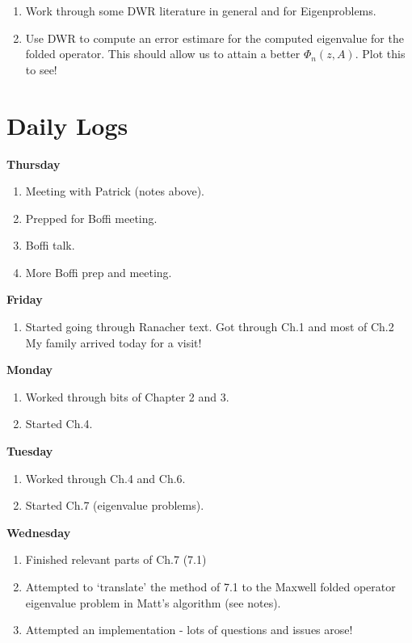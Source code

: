 \documentclass[12pt,a4paper]{article}
\begin{document}
\begin{enumerate}
    \item Work through some DWR literature in general and for Eigenproblems.
    \item Use DWR to compute an error estimare for the computed eigenvalue for the folded operator. This should allow us to attain a better $\Phi_n(z, A).$ Plot this to see!

\end{enumerate}


\section{Daily Logs}

\textbf{Thursday}

\begin{enumerate}
    \item Meeting with Patrick (notes above).
    \item Prepped for Boffi meeting.
    \item Boffi talk.
    \item More Boffi prep and meeting.
\end{enumerate}

\textbf{Friday}

\begin{enumerate}
    \item Started going through Ranacher text. Got through Ch.1 and most of Ch.2 My family arrived today for a visit!
\end{enumerate}

\textbf{Monday}

\begin{enumerate}
    \item Worked through bits of Chapter 2 and 3.
    \item Started Ch.4.
\end{enumerate}

\textbf{Tuesday}

\begin{enumerate}
    \item Worked through Ch.4 and Ch.6.
    \item Started Ch.7 (eigenvalue problems).
\end{enumerate}

\textbf{Wednesday}

\begin{enumerate}

\item Finished relevant parts of Ch.7 (7.1)
\item Attempted to `translate' the method of 7.1 to the Maxwell folded operator eigenvalue problem in Matt's algorithm (see notes).
\item Attempted an implementation - lots of questions and issues arose!
\end{enumerate}
\end{document}
